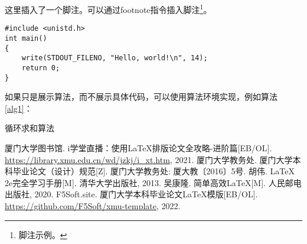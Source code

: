 \documentclass{xmu}
\begin{document}
这里插入了一个脚注。可以通过footnote指令插入脚注\footnote{脚注示例。}。
\begin{verbatim}
#include <unistd.h>
int main()
{
    write(STDOUT_FILENO, "Hello, world!\n", 14);
    return 0;
}
\end{verbatim}
如果只是展示算法，而不展示具体代码，可以使用算法环境实现，例如算法 \ref{alg1}：
\begin{algorithm}[!htb]
    \caption{循环求和算法}\label{alg1}
\end{algorithm}


\begin{reference}

    \begin{thebibliography}{5}
         厦门大学图书馆. i学堂直播：使用LaTeX排版论文全攻略-进阶篇[EB/OL]. \url{https://library.xmu.edu.cn/wd/jzkj/i_xt.htm}, 2021.
         厦门大学教务处. 厦门大学本科毕业论文（设计）规范[Z]. 厦门大学教务处: 厦大教〔2016〕5号.
         胡伟. LaTeX 2e完全学习手册[M]. 清华大学出版社, 2013.
         吴康隆. 简单高效LaTeX[M]. 人民邮电出版社, 2020.
         F5Soft.site. 厦门大学本科毕业论文LaTeX模版[EB/OL]. \url{https://github.com/F5Soft/xmu-template}, 2022.
    \end{thebibliography}
\end{reference}

\end{document}
